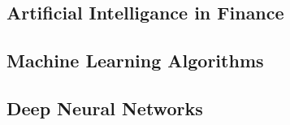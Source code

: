 \subsection{Artificial Intelligance in Finance}


\subsection{Machine Learning Algorithms}


\subsection{Deep Neural Networks}
